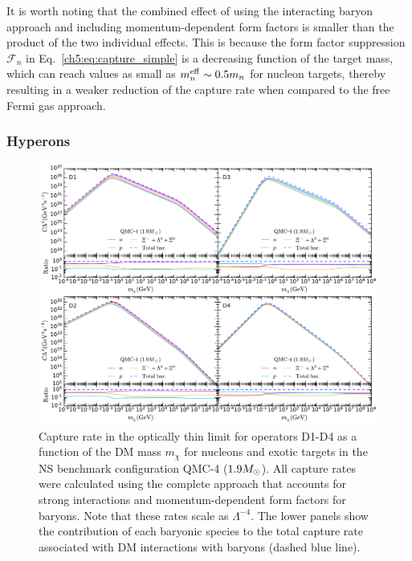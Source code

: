 It is worth noting that the combined effect of using the interacting baryon approach and including momentum-dependent form factors is smaller than the product of the two individual effects. This is because the form factor suppression $\mathcal{F}_n$ in Eq.~\ref{ch5:eq:capture_simple} is a decreasing function of the target mass, which can reach values as small as $m_n^{\rm eff}\sim0.5m_n$ for nucleon targets, thereby resulting in a weaker reduction of the capture rate when compared to the free Fermi gas approach. 





\subsubsection{Hyperons}
\label{sec:capresexotic}

\begin{figure}[t!bp] 
\centering
\includegraphics[width=\textwidth]{capture_3/D1_D4_C_mDM_hyper_meff_ratio.pdf}
\caption[Capture rate in the optically thin limit for operators D1-D4 as a function of the DM mass $m_\chi$ for nucleons and exotic targets in the NS benchmark configuration QMC-4 ($1.9\Msun$).]{Capture rate in the optically thin limit for operators D1-D4 as a function of the DM mass $m_\chi$ for nucleons and exotic targets in the NS benchmark configuration QMC-4 ($1.9\Msun$). All capture rates were calculated using the complete approach that accounts for strong interactions and momentum-dependent form factors for baryons. Note that these rates scale as $\Lambda^{-4}$. The lower panels show the contribution of each baryonic species to the total capture rate associated with DM interactions with baryons (dashed blue line). 
}
\label{ch5:fig:capratesD1D4_Hyper}
\end{figure}  



